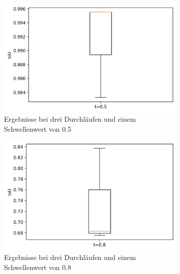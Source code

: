	\begin{figure}[h]
		\centering
		\begin{subfigure}[c]{0.32\textwidth}			
			\includegraphics[width=1\textwidth,center]{bilder/Hauptteil/MT_Grapple/IoU_05_MT_Grapple.png}
			\caption{Ergebnisse bei drei Durchläufen und einem Schwellenwert von 0.5}
			\label{img:BoxPlot_05_MT-Ansatz}	
		\end{subfigure}
		\centering
		\begin{subfigure}[c]{0.32\textwidth}			
			\includegraphics[width=1\textwidth,center]{bilder/Hauptteil/MT_Grapple/IoU_08_MT_Grapple.png}
			\caption{Ergebnisse bei drei Durchläufen und einem Schwellenwert von 0.8}
			\label{img:BoxPlot_08_MT-Ansatz}	
		\end{subfigure}
		\begin{subfigure}[c]{0.32\textwidth}			

\end{subfigure}
\end{figure}

